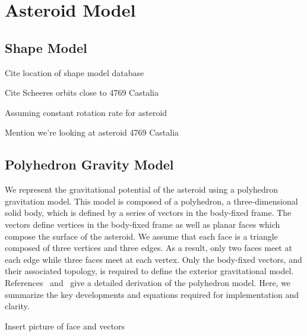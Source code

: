 \documentclass[]{aiaa-tc}%
\begin{document}
\section{Asteroid Model}\label{sec:asteroid_model}

\subsection{Shape Model}
Cite location of shape model database

Cite Scheeres orbits close to 4769 Castalia

Assuming constant rotation rate for asteroid

Mention we're looking at asteroid 4769 Castalia

\subsection{Polyhedron Gravity Model}\label{sec:polyhedron_model}

We represent the gravitational potential of the asteroid using a polyhedron gravitation model.
This model is composed of a polyhedron, a three-dimensional solid body, which is defined by a series of vectors in the body-fixed frame.
The vectors define vertices in the body-fixed frame as well as planar faces which compose the surface of the asteroid.
We assume that each face is a triangle composed of three vertices and three edges.
As a result, only two faces meet at each edge while three faces meet at each vertex.
Only the body-fixed vectors, and their associated topology, is required to define the exterior gravitational model.
References~ and~ give a detailed derivation of the polyhedron model.
Here, we summarize the key developments and equations required for implementation and clarity.

{\LARGE Insert picture of face and vectors}
\end{document}
